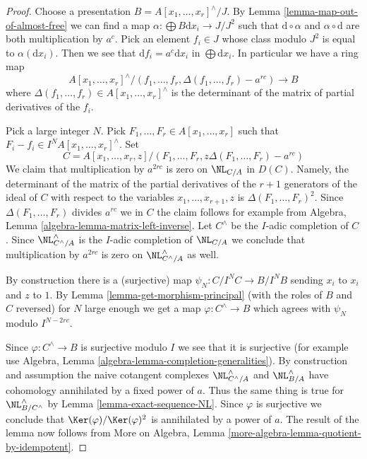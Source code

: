 \begin{proof}
Choose a presentation $B = A[x_1, \ldots, x_r]^\wedge/J$.
By Lemma \ref{lemma-map-out-of-almost-free} we can find a map
$\alpha : \bigoplus B\text{d}x_i \to J/J^2$ such that
$\text{d} \circ \alpha$ and $\alpha \circ \text{d}$ are both
multiplication by $a^c$. Pick an element $f_i \in J$ whose
class modulo $J^2$ is equal to $\alpha(\text{d}x_i)$.
Then we see that $\text{d}f_i = a^c \text{d}x_i$ in $\bigoplus \text{d}x_i$.
In particular we have a ring map
$$
A[x_1, \ldots, x_r]^\wedge/
(f_1, \ldots, f_r, \Delta(f_1, \ldots, f_r) - a^{rc})
\longrightarrow B
$$
where $\Delta(f_1, \ldots, f_r) \in A[x_1, \ldots, x_r]^\wedge$
is the determinant of the matrix of partial derivatives of the $f_i$.

\medskip\noindent
Pick a large integer $N$. Pick $F_1, \ldots, F_r \in A[x_1, \ldots, x_r]$
such that $F_i - f_i \in I^NA[x_1, \ldots, x_r]^\wedge$. Set
$$
C = A[x_1, \ldots, x_r, z]/
(F_1, \ldots, F_r, z\Delta(F_1, \ldots, F_r) - a^{rc})
$$
We claim that multiplication by $a^{2rc}$ is zero on $\NL_{C/A}$ in $D(C)$.
Namely, the determinant of the matrix of the partial derivatives
of the $r + 1$ generators of the ideal of $C$ with respect to the variables
$x_1, \ldots, x_{r + 1}, z$ is $\Delta(F_1, \ldots, F_r)^2$. Since
$\Delta(F_1, \ldots, F_r)$ divides $a^{rc}$ we in $C$ the
claim follows for example from
Algebra, Lemma \ref{algebra-lemma-matrix-left-inverse}.
Let $C^\wedge$ be the $I$-adic completion of $C$. Since
$\NL^\wedge_{C^\wedge/A}$ is the $I$-adic completion of $\NL_{C/A}$
we conclude that multiplication by $a^{2rc}$ is zero on
$\NL^\wedge_{C^\wedge/A}$ as well.

\medskip\noindent
By construction there is a (surjective) map $\psi_N : C/I^NC \to B/I^NB$
sending $x_i$ to $x_i$ and $z$ to $1$. By
Lemma \ref{lemma-get-morphism-principal} (with the roles of $B$ and $C$
reversed) for $N$ large enough we get a map $\varphi : C^\wedge \to B$ which
agrees with $\psi_N$ modulo $I^{N - 2rc}$.

\medskip\noindent
Since $\varphi : C^\wedge \to B$ is surjective modulo $I$ we see that it is
surjective (for example use
Algebra, Lemma \ref{algebra-lemma-completion-generalities}).
By construction and assumption the naive cotangent complexes
$\NL^\wedge_{C^\wedge/A}$ and $\NL^\wedge_{B/A}$
have cohomology annihilated by a fixed power of $a$. Thus the same thing
is true for $\NL^\wedge_{B/C^\wedge}$ by Lemma \ref{lemma-exact-sequence-NL}.
Since $\varphi$ is surjective we conclude that
$\Ker(\varphi)/\Ker(\varphi)^2$ is annihilated by a power of $a$.
The result of the lemma now follows from
More on Algebra, Lemma \ref{more-algebra-lemma-quotient-by-idempotent}.
\end{proof}









